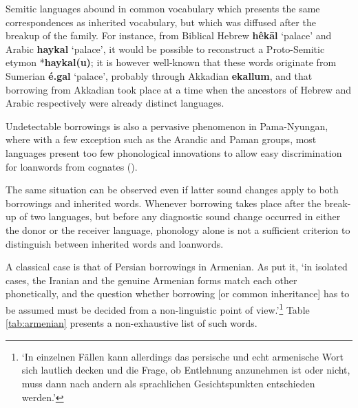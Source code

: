 \documentclass[oneside,a4paper,11pt]{article}
\newcommand{\ipa}[1]{\textbf{{\phon\mbox{#1}}}}
\begin{document}
Semitic languages abound in common vocabulary which presents the same correspondences as inherited vocabulary, but which was diffused after the breakup of the family. For instance, from Biblical Hebrew \ipa{hêkāl} `palace' and Arabic \ipa{haykal} `palace', it would be possible to reconstruct a Proto-Semitic etymon *\ipa{haykal(u)}; it is however well-known that these words originate from Sumerian \ipa{é.gal} `palace', probably through Akkadian \ipa{ekallum}, and that borrowing from Akkadian took place at a time when the ancestors of Hebrew and Arabic respectively were already distinct languages.

Undetectable borrowings is also a pervasive phenomenon in Pama-Nyungan, where with a few exception such as the Arandic and Paman groups, most languages present too few phonological innovations to allow easy discrimination for loanwords from cognates (\citealt[46]{koch04method}).

The same situation can be observed even if latter sound changes apply to both borrowings and inherited words. Whenever borrowing takes place after the break-up of two languages, but before any diagnostic sound change occurred in either the donor or the receiver language, phonology alone is not a sufficient criterion to distinguish between inherited words and loanwords. 


A classical case is that of Persian borrowings in Armenian. As \citet[16-17]{huebschmann97armenische} put it, `in isolated cases, the Iranian and the genuine Armenian forms match each other phonetically, and the question whether borrowing [or common inheritance] has to be assumed must be decided from a non-linguistic point of view.'\footnote{`In einzelnen Fällen kann allerdings das persische und echt armenische Wort sich lautlich decken und die Frage, ob Entlehnung anzunehmen ist oder nicht, muss dann nach andern als sprachlichen Gesichtspunkten entschieden werden.'} Table \ref{tab:armenian} presents a non-exhaustive list of such words.
\end{document}
